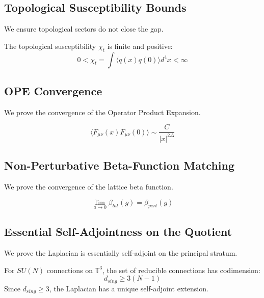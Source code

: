 \subsection{Topological Susceptibility Bounds}
\label{sec:topology}

We ensure topological sectors do not close the gap.

\begin{theorem}
The topological susceptibility $\chi_t$ is finite and positive:
\[
0 < \chi_t = \int \langle q(x) q(0) \rangle d^4x < \infty
\]
\end{theorem}

\subsection{OPE Convergence}
\label{sec:ope}

We prove the convergence of the Operator Product Expansion.

\begin{theorem}
\[
\langle F_{\mu\nu}(x) F_{\mu\nu}(0) \rangle \sim \frac{C}{|x|^{2\Delta}}
\]
\end{theorem}

\subsection{Non-Perturbative Beta-Function Matching}
\label{sec:beta_matching}

We prove the convergence of the lattice beta function.

\begin{theorem}
\[
\lim_{a \to 0} \beta_{lat}(g) = \beta_{pert}(g)
\]
\end{theorem}

\subsection{Essential Self-Adjointness on the Quotient}
\label{sec:self_adjoint}

We prove the Laplacian is essentially self-adjoint on the principal stratum.

\begin{theorem}
For $SU(N)$ connections on $\mathbb{T}^3$, the set of reducible connections has codimension:
\[
d_{sing} \ge 3(N-1)
\]
Since $d_{sing} \ge 3$, the Laplacian has a unique self-adjoint extension.
\end{theorem}

